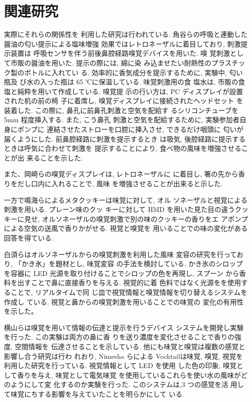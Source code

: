 \section{関連研究}

実際にそれらの関係性を
利用した研究は行われている.
角谷らの呼吸と連動した醤油の匂い提示による塩味増強
効果\cite{enmi}ではレトロネーザルに着目しており, 刺激提示装置は
呼吸センサを伴う前後鼻腔経路嗅覚デバイスを用いた. 嗅
覚刺激として市販の醤油を用いた. 提示の際には, 綿に染
み込ませたい耐熱性のプラスチック製のボトルに入れてい
る. 効率的に香気成分を提示するために, 実験中, 匂い瓶及
び水の入った瓶は 65 ℃に保温している. 味覚刺激用の食
塩水は, 市販の食塩と純粋を用いて作成している. 嗅覚提
示の行い方は, PC ディスプレイが設置された机の前の椅
子に着席し, 嗅覚ディスプレイに接続されたヘッドセット
を装着した. この際に, 鼻孔に前鼻孔刺激と空気を配給す
るシリコンチューブを 5mm 程度挿入する. また, こう鼻孔
刺激と空気を配給するために, 実験参加者自身にポンプに
連結させたストローを口腔に挿入させ, できるだけ咽頭に
匂いが届くようにした. 前鼻腔経路に刺激を提示するとき
は吸気, 後腔経路に提示するときは呼気に合わせて刺激を
提示することにより, 食べ物の風味を増強させることが出
来ることを示した.


また、岡崎らの嗅覚ディスプレイは, レトロネーザルに
に着目し, 箸の先から香りをだし口内に入れることで, 風味
を増強させることが出来ると示した.\cite{hasi}


一方で鳴海らによるメタクッキー\cite{narumi2}は味覚に対して, オル
ソネーザルと視覚による刺激を用いる. プレーン味のクッ
キーに対して HMD を用いた見た目の違うクッキーに見せ,
オルソネーザルの嗅覚刺激で別の味のクッキーの香りをエ
アポンプによる空気の送風で香りかがせる. 視覚と嗅覚を
用いることでの味の変化がある回答を得ている.


白須らはオルソネーザルからの嗅覚刺激を利用した風味
変容の研究を行っており, 「かき氷」を題材とし, 味覚変容
の手法を検討している. かき氷のシロップを容器に LED
光源を取り付けることでシロップの色を再現し, スプーン
から香料を出すことで鼻に直接香りを与える. 視覚的に着
色料ではなく光源をを使用することで, リアルタイムで同
じ皿で視覚情報と嗅覚情報を切り替えるシステムを作成し
ている. 視覚と鼻からの嗅覚刺激を用いることでの味覚の
変化の有用性を示した。\cite{fan}\cite{pomp}


横山らは嗅覚を用いて情報の伝達と提示を行うデバイス
システム\cite{hirose}を開発し実験を行った. この実験は両方の鼻に香
りを送り濃度を変化させることで香りの強度, 空間情報を
伝達させることを示している.
他にも味覚と嗅覚は複数の感覚と影響し合う研究は行わ
れおり, Nimesha らによる Vocktail\cite{vock}は味覚, 嗅覚, 視覚を
利用した研究を行っている. 視覚情報として LED を使用
した色の印象, 嗅覚として香りを与え, 味覚として電気味覚
を使用しているこれらを使い水の風味がどのようにして変
化するのか実験を行った. このシステムは,3 つの感覚を活
用して味覚にちする影響を与えていたことを明らかにして
いる.
